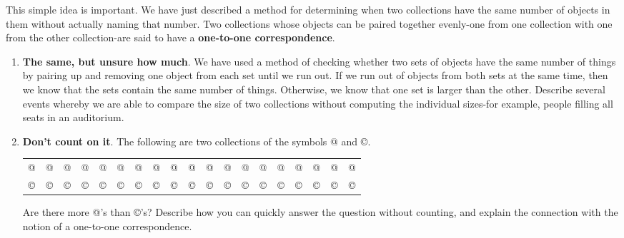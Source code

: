 This simple idea is important. We have just described a method for determining when two collections have the same number of objects in them without actually naming that number. Two collections whose objects can be paired together evenly-one from one collection with one from the other collection-are said to have a \textbf{one-to-one correspondence}.
\clearpage

\begin{enumerate}
\item  \textbf{The same, but unsure how much}. We have used a method of checking whether two sets of objects have the same number of things by pairing up and removing one object from each set until we run out. If we run out of objects from both sets at the same time, then we know that the sets contain the same number of things. Otherwise, we know that one set is larger than the other. Describe several events whereby we are able to compare the size of two collections without computing the individual sizes-for example, people filling all seats in an auditorium.


\vfill \item  \textbf{Don't count on it}. The following are two collections of the symbols @ and \copyright.
\begin{center} \small
	\begin{tabular}{*{19}{c}}
@  & @  & @  & @  & @  & @  & @  & @  & @  & @  & @  & @  & @  & @  & @  & @  & @  & @  & @ \\
\copyright  & \copyright  & \copyright  & \copyright  & \copyright  & \copyright  & \copyright  & \copyright  & \copyright  & \copyright  & \copyright  & \copyright  & \copyright  & \copyright  & \copyright  & \copyright  & \copyright  & \copyright  & \copyright \\
	\end{tabular}
\end{center}
Are there more @'s than \copyright's? Describe how you can quickly answer the question without counting, and explain the connection with the notion of a one-to-one correspondence.


\end{enumerate}
